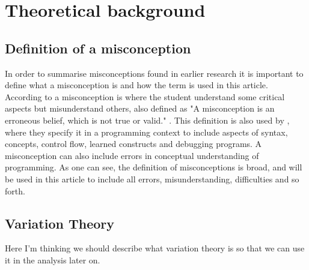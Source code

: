 \section{Theoretical background}

\subsection{Definition of a misconception}

In order to summarise misconceptions found in earlier research it is 
important to define what a misconception is and how the term is used in this 
article. According to \textcite{NCOL} a misconception is where the student 
understand some critical aspects but misunderstand others, also defined  as 
"A misconception is an erroneous belief, which is not true or valid." 
\parencite[p. 1]{KumarVeerasamy2016}. This definition is also used by 
\textcite{MisconceptionsSurvey2017}, where they specify it in a programming 
context to include aspects of syntax, concepts, control flow, learned 
constructs and debugging programs. A misconception can also include errors in 
conceptual understanding of programming. As one can see, the definition of 
misconceptions is broad, and will be used in this article to include all 
errors, misunderstanding, difficulties and so forth. 

\subsection{Variation Theory}

Here I'm thinking we should describe what variation theory is so that we can 
use it in the analysis later on.